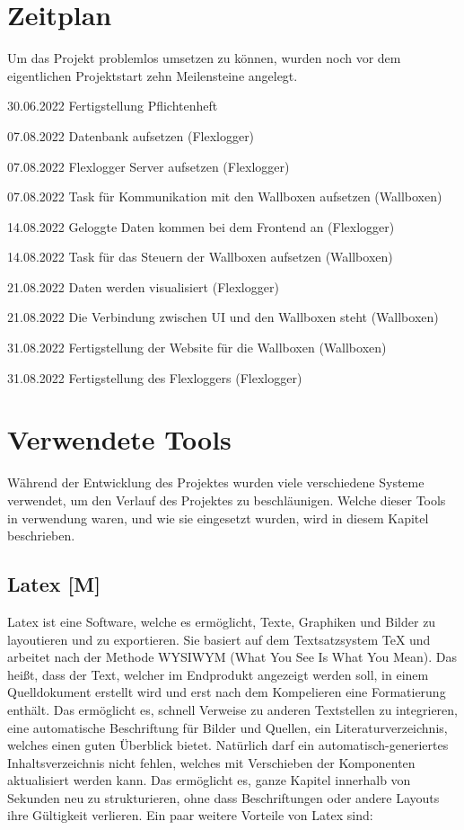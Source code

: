  
\section{Zeitplan}
 

Um das Projekt problemlos umsetzen zu können, wurden noch vor dem eigentlichen Projektstart zehn Meilensteine angelegt.   

\begin{compactitem}
  \item 30.06.2022 Fertigstellung Pflichtenheft  
  \item 07.08.2022 Datenbank aufsetzen (Flexlogger)  
  \item 07.08.2022 Flexlogger Server aufsetzen (Flexlogger)  
  \item 07.08.2022 Task für Kommunikation mit den Wallboxen aufsetzen (Wallboxen)  
  \item 14.08.2022 Geloggte Daten kommen bei dem Frontend an (Flexlogger)  
  \item 14.08.2022 Task für das Steuern der Wallboxen aufsetzen (Wallboxen)  
  \item 21.08.2022 Daten werden visualisiert (Flexlogger)  
  \item 21.08.2022 Die Verbindung zwischen UI und den Wallboxen steht (Wallboxen)  
  \item 31.08.2022 Fertigstellung der Website für die Wallboxen (Wallboxen)  
  \item 31.08.2022 Fertigstellung des Flexloggers (Flexlogger) 
\end{compactitem}
 
\section{Verwendete Tools}
 Während der Entwicklung des Projektes wurden viele verschiedene Systeme verwendet, um den Verlauf des Projektes zu beschläunigen. Welche dieser Tools in verwendung waren, und wie sie eingesetzt wurden, wird in diesem Kapitel beschrieben.
 
 
\subsection{Latex [M]} 

Latex ist eine Software, welche es ermöglicht, Texte, Graphiken und Bilder zu layoutieren und zu exportieren. Sie basiert auf dem Textsatzsystem TeX und arbeitet nach der Methode WYSIWYM (What You See Is What You Mean). Das heißt, dass der Text, welcher im Endprodukt angezeigt werden soll, in einem Quelldokument erstellt wird und erst nach dem Kompelieren eine Formatierung enthält. Das ermöglicht es, schnell Verweise zu anderen Textstellen zu integrieren, eine automatische Beschriftung für Bilder und Quellen, ein Literaturverzeichnis, welches einen guten Überblick bietet. Natürlich darf ein automatisch-generiertes Inhaltsverzeichnis nicht fehlen, welches mit Verschieben der Komponenten aktualisiert werden kann. Das ermöglicht es, ganze Kapitel innerhalb von Sekunden neu zu strukturieren, ohne dass Beschriftungen oder andere Layouts ihre Gültigkeit verlieren. Ein paar weitere Vorteile von Latex sind:  

